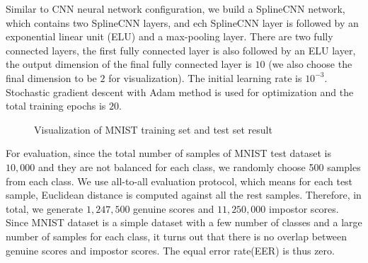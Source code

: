 Similar to CNN neural network configuration, we build a SplineCNN network, which contains two SplineCNN layers, and ech SplineCNN layer is followed by an exponential linear unit (ELU) and a max-pooling layer. There are two fully connected layers, the first fully connected layer is also followed by an ELU layer, the output dimension of the final fully connected layer is $10$ (we also choose the final dimension to be $2$ for visualization). The initial learning rate is $10^{-3}$. Stochastic gradient descent with Adam method is used for optimization and the total training epochs is $20$.

\begin{figure}[htb]
    \begin{minipage}[b]{0.48\linewidth}
        \centering
        \centerline{}
    \end{minipage}
    \hfill
    \begin{minipage}[b]{0.48\linewidth}
        \centering
        \centerline{}
    \end{minipage}
    \caption{Visualization of MNIST training set and test set result}
    \label{fig:mnist_plot}
\end{figure}

For evaluation, since the total number of samples of MNIST test dataset is $10,000$ and they are not balanced for each class, we randomly choose 500 samples from each class. We use all-to-all evaluation protocol, which means for each test sample, Euclidean distance is computed against all the rest samples. Therefore, in total, we generate $1,247,500$ genuine scores and $11,250,000$ impostor scores. Since MNIST dataset is a simple dataset with a few number of classes and a large number of samples for each class, it turns out that there is no overlap between genuine scores and impostor scores. The equal error rate(EER) is thus zero.

